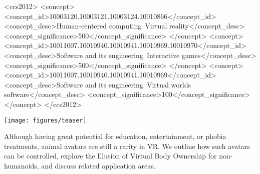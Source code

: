 \documentclass[acmtog,anonymous,review]{acmart}
\begin{document}
%
%
\begin{CCSXML}
<ccs2012>
<concept>
<concept_id>10003120.10003121.10003124.10010866</concept_id>
<concept_desc>Human-centered computing~Virtual reality</concept_desc>
<concept_significance>500</concept_significance>
</concept>
<concept>
<concept_id>10011007.10010940.10010941.10010969.10010970</concept_id>
<concept_desc>Software and its engineering~Interactive games</concept_desc>
<concept_significance>500</concept_significance>
</concept>
<concept>
<concept_id>10011007.10010940.10010941.10010969</concept_id>
<concept_desc>Software and its engineering~Virtual worlds software</concept_desc>
<concept_significance>100</concept_significance>
</concept>
</ccs2012>
\end{CCSXML}




\begin{teaserfigure}
  \texttt{[image: figures/teaser]}
  \caption{Although having great potential for education, entertainment, or phobia treatments, animal avatars are still a rarity in VR. We outline how such avatars can be controlled, explore the Illusion of Virtual Body Ownership for non-humanoids, and discuss related application areas.}
  \label{fig:teaser}
\end{teaserfigure}

\maketitle


\end{document}
